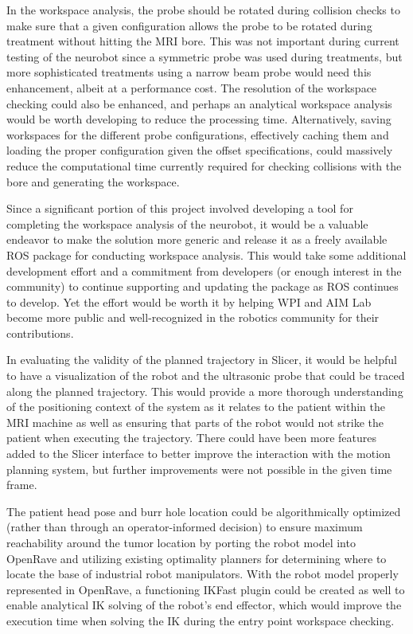 \documentclass[12pt]{report}
\begin{document}
In the workspace analysis, the probe should be rotated during collision checks to make sure that a given configuration allows the probe to be rotated during treatment without hitting the MRI bore. This was not important during current testing of the neurobot since a symmetric probe was used during treatments, but more sophisticated treatments using a narrow beam probe would need this enhancement, albeit at a performance cost. The resolution of the workspace checking could also be enhanced, and perhaps an analytical workspace analysis would be worth developing to reduce the processing time. Alternatively, saving workspaces for the different probe configurations, effectively caching them and loading the proper configuration given the offset specifications, could massively reduce the computational time currently required for checking collisions with the bore and generating the workspace. 

Since a significant portion of this project involved developing a tool for completing the workspace analysis of the neurobot, it would be a valuable endeavor to make the solution more generic and release it as a freely available ROS package for conducting workspace analysis. This would take some additional development effort and a commitment from developers (or enough interest in the community) to continue supporting and updating the package as ROS continues to develop. Yet the effort would be worth it by helping WPI and AIM Lab become more public and well-recognized in the robotics community for their contributions.

In evaluating the validity of the planned trajectory in Slicer, it would be helpful to have a visualization of the robot and the ultrasonic probe that could be traced along the planned trajectory. This would provide a more thorough understanding of the positioning context of the system as it relates to the patient within the MRI machine as well as ensuring that parts of the robot would not strike the patient when executing the trajectory. There could have been more features added to the Slicer interface to better improve the interaction with the motion planning system, but further improvements were not possible in the given time frame.

The patient head pose and burr hole location could be algorithmically optimized (rather than through an operator-informed decision) to ensure maximum reachability around the tumor location by porting the robot model into OpenRave and utilizing existing optimality planners for determining where to locate the base of industrial robot manipulators. \cite{workspaceChecker} With the robot model properly represented in OpenRave, a functioning IKFast plugin could be created as well to enable analytical IK solving of the robot's end effector, which would improve the execution time when solving the IK during the entry point workspace checking.
\end{document}
